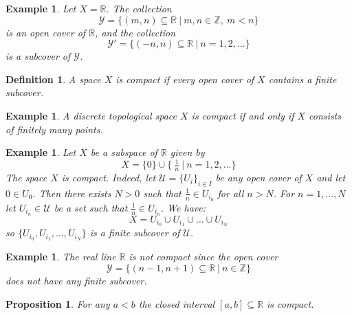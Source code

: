 \documentclass[11pt, letterpaper, oneside]{report}
\theoremstyle{pplain}
\newtheorem{proposition}[theorem]{Proposition}
\newtheorem{ITERMVALUE THM}[theorem]{Intermediate Value Theorem}
\newtheorem{HEINEBOREL THM}[theorem]{Heine-Borel Theorem}
\newtheorem{UMETR THM}[theorem]{Urysohn Metrization Theorem}
\newtheorem{UMETR2 THM}[theorem]{Urysohn Metrization Theorem (v.2)}
\theoremstyle{ddefinition}
\newtheorem{definition}[theorem]{Definition}
\newtheorem{example}[theorem]{Example}
\theoremstyle{nnn}
\newtheorem{TDA NN}[theorem]{Topological Data Analysis. }
\theoremstyle{eexercise}
\newcommand{\Z}{{\mathbb Z}}
\newcommand{\R}{{\mathbb R}}
\newcommand{\UU}{{\mathcal U}}
\newcommand{\YY}{{\mathcal Y}}
\begin{document}
\begin{example}
Let $X = \R$. The collection 
$$\YY = \{(m, n)\subseteq \R \ | \ m, n\in \Z, \ m< n \}$$
is an open cover of $\R$, and the collection 
$$\YY' = \{(-n, n) \subseteq \R\ | \ n= 1, 2, \dots  \}$$
is a subcover of $\YY$.  
\end{example}

\begin{definition}
A space $X$ is \emph{compact} if every open cover of $X$ contains a finite subcover. 
\end{definition}

\begin{example}
A discrete topological space $X$ is compact if and only if  $X$ consists of finitely many points. 
\end{example}


\begin{example}
Let $X$ be a subspace of $\R$ given by 
$$X = \{0 \} \cup \{\ \tfrac{1}{n} \ | \ n= 1, 2, \dots \}$$
The space $X$ is compact. 
Indeed, let $\UU = \{ U_{i} \}_{i\in I}$ be any open cover of $X$
and let $0\in U_{0}$. Then there exists $N>0$ such that $\frac{1}{n}\in U_{i_{0}}$ for all $n> N$. 
For $n=1, \dots, N$ let $U_{i_{n}}\in \UU$ be a set such that $\frac{1}{n}\in U_{i_{n}}$. We have:
$$X = U_{i_{0}} \cup U_{i_{1}} \cup \dots \cup U_{i_{N}}$$
so $\{U_{i_{0}}, U_{i_{1}}, \dots, U_{i_{N}}\}$ is a finite subcover of $\UU$.
\end{example}


\begin{example}
The real line $\R$ is not compact
since the open cover 
$$\YY = \{(n-1, n+1) \subseteq \R \ | \ n\in \Z \}$$
does not have any finite subcover. 
\end{example}




\begin{proposition}
\label{CLOSEDINT COMPACT PROP}
For any $a< b$ the closed interval $[a, b]\subseteq \R$ is compact.  
\end{proposition}
\end{document}

